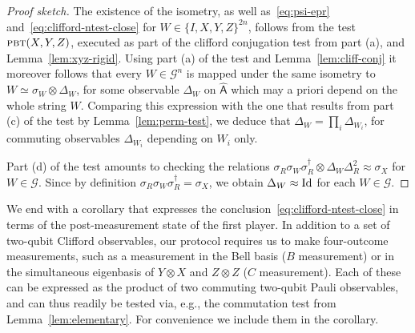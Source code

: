 \documentclass[11pt]{article}
\theoremstyle{remark}
\theoremstyle{definition}
\newcommand{\Id}{\ensuremath{\mathop{\rm Id}\nolimits}}
\newcommand{\Es}[1]{\ensuremath{\mathop{\textsc{E}}_{#1}}}
\newcommand{\reg}[1]{{\textsf{#1}}}
\newcommand{\mH}{\mathcal{H}}
\newcommand{\eps}{\varepsilon}
\newcommand{\pbt}{\textsc{pbt}}
\begin{document}
\begin{proof}[Proof sketch]
The existence of the isometry, as well as~\eqref{eq:psi-epr} and~\eqref{eq:clifford-ntest-close} for $W \in \{I,X,Y,Z\}^{2n}$, follows from the test $\pbt(X,Y,Z)$, executed as part of the clifford conjugation test from part (a), and Lemma~\ref{lem:xyz-rigid}. 
Using part (a) of the test and Lemma~\ref{lem:cliff-conj} it moreover follows that every $W \in \mathcal{G}^n$ is mapped under the same isometry to $W \simeq \sigma_W \otimes \Delta_{W}$, for some observable $\Delta_W$ on $\hat{\reg{A}}$ which may a priori depend on the whole string $W$. Comparing this expression with the one that results from part (c) of the test by Lemma~\ref{lem:perm-test}, we deduce that $\Delta_W = \prod_i \Delta_{W_i}$, for commuting observables $\Delta_{W_i}$ depending on $W_i$ only. 

 Part (d) of the test amounts to checking the relations $\sigma_R \sigma_W \sigma_R^\dagger \otimes \Delta_W \Delta_R^2 \approx \sigma_X$ for $W\in \mathcal{G}$. Since by definition $\sigma_R \sigma_W \sigma_R^\dagger = \sigma_X$, we obtain $\Delta_W \approx \Id$ for each $W\in\mathcal{G}$. 


%
\end{proof}


We end with a corollary that expresses the conclusion~\eqref{eq:clifford-ntest-close} in terms of the post-measurement state of the first player. In addition to a set of two-qubit Clifford observables, our protocol requires us to make four-outcome measurements, such as a measurement in the Bell basis ($B$ measurement) or in the simultaneous eigenbasis of $Y\otimes X$ and $Z\otimes Z$ ($C$ measurement). Each of these can be expressed as the product of two commuting two-qubit Pauli observables, and can thus readily be tested via, e.g., the commutation test from Lemma~\ref{lem:elementary}. For convenience we include them in the corollary. 
\end{document}

